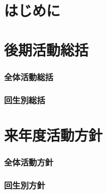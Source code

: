 \part*{はじめに}


\newpage
\part{後期活動総括}
\section{全体活動総括}

\section{回生別総括}










\newpage
\part{来年度活動方針}
\section{全体活動方針}

\section{回生別方針}









